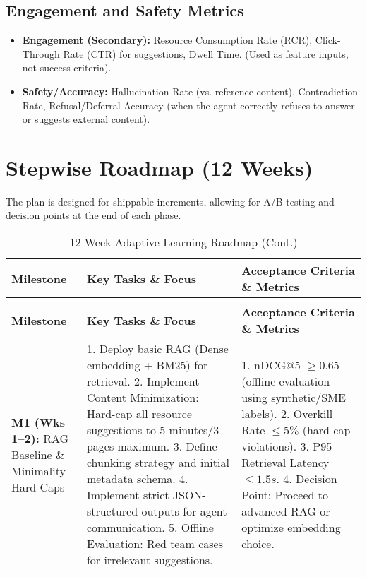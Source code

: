 \documentclass[12pt]{article}
\begin{document}
\begin{enumerate}
\subsection{Engagement and Safety Metrics}
\begin{itemize}[noitemsep]
    \item \textbf{Engagement (Secondary):} Resource Consumption Rate (RCR), Click-Through Rate (CTR) for suggestions, Dwell Time. (Used as feature inputs, not success criteria).
    \item \textbf{Safety/Accuracy:} Hallucination Rate (vs. reference content), Contradiction Rate, Refusal/Deferral Accuracy (when the agent correctly refuses to answer or suggests external content).
\end{itemize}

\section{Stepwise Roadmap (12 Weeks)}

The plan is designed for shippable increments, allowing for A/B testing and decision points at the end of each phase.

\begin{longtable}{p{2.5cm}p{6.5cm}p{4.0cm}}
\caption{12-Week Adaptive Learning Roadmap} \\
\toprule
\textbf{Milestone} & \textbf{Key Tasks \& Focus} & \textbf{Acceptance Criteria \& Metrics} \\
\midrule
\endfirsthead
\caption{12-Week Adaptive Learning Roadmap (Cont.)} \\
\toprule
\textbf{Milestone} & \textbf{Key Tasks \& Focus} & \textbf{Acceptance Criteria \& Metrics} \\
\midrule
\endhead
\bottomrule
\endfoot
\endlastfoot

\textbf{M1 (Wks 1–2):} RAG Baseline \& Minimality Hard Caps &
1. Deploy basic RAG (Dense embedding + BM25) for retrieval.
2. Implement Content Minimization: Hard-cap all resource suggestions to 5 minutes/3 pages maximum.
3. Define chunking strategy and initial metadata schema.
4. Implement strict JSON-structured outputs for agent communication.
5. Offline Evaluation: Red team cases for irrelevant suggestions. &
1. nDCG@5 $\ge 0.65$ (offline evaluation using synthetic/SME labels).
2. Overkill Rate $\le 5\%$ (hard cap violations).
3. P95 Retrieval Latency $\le 1.5s$.
4. Decision Point: Proceed to advanced RAG or optimize embedding choice. \\


\end{longtable}
\end{enumerate}
\end{document}
